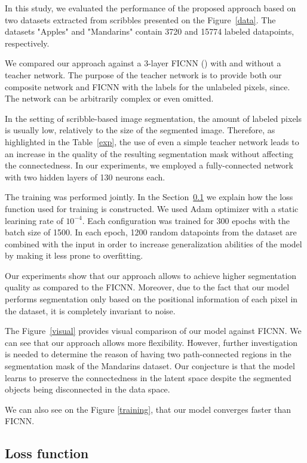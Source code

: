 In this study, we evaluated the performance of the proposed approach based on two datasets
extracted from scribbles presented on the Figure~\ref{data}.
The datasets "Apples" and "Mandarins" contain 3720 and 15774 labeled datapoints, respectively.

We compared our approach against a 3-layer FICNN (\cite{amos2017input}) with and without
a teacher network. The purpose of the teacher network is to provide both our composite network and FICNN
with the labels for the unlabeled pixels, since. The network can be arbitrarily complex or even omitted.

In the setting of scribble-based image segmentation, the amount of labeled pixels is usually low,
relatively to the size of the segmented image.
Therefore, as highlighted in the Table~\ref{exp}, the use of even a simple teacher
network leads to an increase in the quality of the resulting segmentation mask
without affecting the connectedness.
In our experiments, we employed a fully-connected network
with two hidden layers of 130 neurons each.

The training was performed jointly. In the Section~\ref{loss} we explain how the
loss function used for training is constructed.
We used Adam optimizer with a static learining rate of $10^{-4}$.
Each configuration was trained for 300 epochs with the batch size of 1500.
In each epoch, 1200 random datapoints from the dataset are combined with the input
in order to increase generalization abilities of the model by making it less prone to overfitting.

Our experiments show that our approach allows to achieve higher segmentation quality
as compared to the FICNN.
Moreover, due to the fact that our model performs segmentation only based
on the positional information of each pixel in the dataset, it is completely invariant to noise.

The Figure~\ref{visual} provides visual comparison of our model against FICNN.
We can see that our approach allows more flexibility.
However, further investigation is needed to determine the reason of having two path-connected
regions in the segmentation mask of the Mandarins dataset.
Our conjecture is that the model learns to preserve the connectedness
in the latent space despite the segmented objects being disconnected in the data space.

We can also see on the Figure \ref{training}, that our model converges faster than FICNN.

\subsection{Loss function}
\label{loss}

